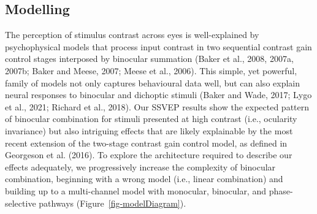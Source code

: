 \documentclass[
  12pt,
]{article}
\begin{document}
\subsection{Modelling}\label{modelling}

The perception of stimulus contrast across eyes is well-explained by
psychophysical models that process input contrast in two sequential
contrast gain control stages interposed by binocular summation (Baker et
al., 2008, 2007a, 2007b; Baker and Meese, 2007; Meese et al., 2006).
This simple, yet powerful, family of models not only captures
behavioural data well, but can also explain neural responses to
binocular and dichoptic stimuli (Baker and Wade, 2017; Lygo et al.,
2021; Richard et al., 2018). Our SSVEP results show the expected pattern
of binocular combination for stimuli presented at high contrast (i.e.,
ocularity invariance) but also intriguing effects that are likely
explainable by the most recent extension of the two-stage contrast gain
control model, as defined in Georgeson et al. (2016). To explore the
architecture required to describe our effects adequately, we
progressively increase the complexity of binocular combination,
beginning with a wrong model (i.e., linear combination) and building up
to a multi-channel model with monocular, binocular, and phase-selective
pathways (Figure~\ref{fig-modelDiagram}).
\end{document}
